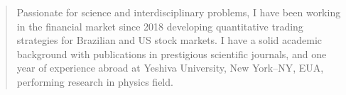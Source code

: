 \documentclass[10pt,a4paper,ragged2e,withhyper]{altacv}
\begin{document}
\begin{paracol}{2}
%            
            
        
        
        
        
        \newpage
        
        \switchcolumn
        
            \begin{quote}
                Passionate for science and interdisciplinary problems, I have been working in the financial market since 2018 developing quantitative trading strategies for Brazilian and US stock markets. I have a solid academic background with publications in prestigious scientific journals, and one year of experience abroad at Yeshiva University, New York--NY, EUA, performing research in physics field.
            \end{quote}
        

\end{paracol}
\end{document}
